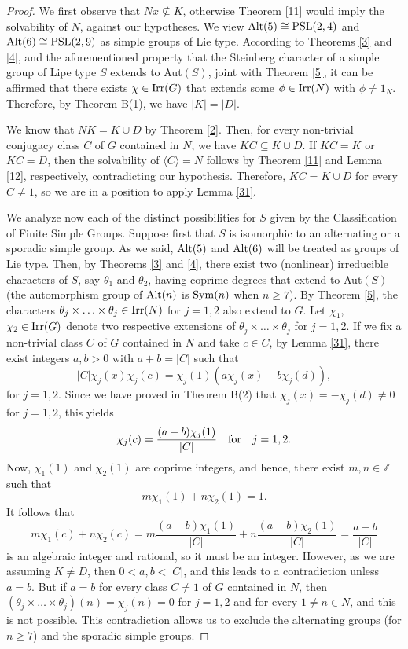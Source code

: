 \documentclass[12pt,leqno,a4paper]{amsart}
\numberwithin{equation}{section}
\begin{document}
\begin{proof}  We first observe that $Nx\not\subseteq K$, otherwise Theorem \ref{11} would imply the solvability of $N$, against our hypotheses. We view ${\rm Alt}(5)\cong {\rm PSL}(2, 4)$ and ${\rm Alt}(6)\cong {\rm PSL}(2, 9)$ as simple groups of Lie type. According to  Theorems \ref{3} and \ref{4}, and the aforementioned property that the Steinberg character of a simple group of Lipe type $S$ extends to Aut$(S)$, joint with  Theorem \ref{5},  it can be affirmed that there exists $\chi \in {\rm Irr}(G)$  that extends some $\phi\in {\rm Irr}(N)$ with $\phi\neq 1_N$.  Therefore, by Theorem B(1),  we have $|K|=|D|$.




\medskip
We know that $NK=K \cup D$ by Theorem \ref{2}. Then, for every non-trivial conjugacy class $C$ of $G$ contained in $N$, we have $KC\subseteq K \cup D$. If $KC=K$ or $KC=D$, then  the solvability of $\langle C\rangle= N$ follows  by Theorem \ref{11} and Lemma \ref{12}, respectively, contradicting our hypothesis. Therefore, $KC=K\cup D$ for every $C\neq 1$, so we are in a position to apply
 Lemma \ref{31}.
\medskip




We  analyze now each of the distinct possibilities for $S$ given by the Classification of Finite Simple Groups.
Suppose first that $S$ is isomorphic to an alternating  or a sporadic simple group. As we said, ${\rm Alt}(5)$ and ${\rm Alt}(6)$ will be treated as groups of Lie type. Then, by Theorems \ref{3} and \ref{4}, there exist two (nonlinear) irreducible characters of $S$, say $\theta_1$ and $\theta_2$, having  coprime degrees that extend to Aut$(S)$ (the automorphism group of ${\rm Alt}(n)$ is ${\rm Sym}(n)$ when $n\geq 7$). By Theorem \ref{5},  the characters $\theta_j\times \ldots \times \theta_j\in {\rm Irr}(N)$ for $j=1,2$ also extend to $G$. Let $\chi_1$, $\chi_2\in {\rm Irr}(G)$ denote two respective extensions of $\theta_j\times \ldots \times \theta_j$ for $j=1,2$.
 If we fix a non-trivial class $C$ of $G$ contained in $N$ and take $c\in C$,  by
 Lemma \ref{31},  there exist integers $a, b> 0$ with $a+b=|C|$ such that
$$|C|\chi_j(x)\chi_j(c)= \chi_j(1)(a \chi_j(x) + b \chi_j(d)),
$$
for $j=1,2$. Since we have proved in Theorem B(2) that $\chi_j(x)=-\chi_j(d)\neq 0$ for $j=1,2$, this yields
$$\chi_j(c)= \frac{(a-b)\chi_j(1)}{|C|} \quad {\rm for \quad } j=1,2.$$
Now, $\chi_1(1)$ and $\chi_2(1)$ are coprime integers, and hence, there exist $m,n\in {\mathbb Z}$ such that
$$m\chi_1(1)+n\chi_2(1)=1.$$
It follows that
$$m\chi_1(c)+ n\chi_2(c)=m \frac{(a-b)\chi_1(1)}{|C|} + n\frac{(a-b)\chi_2(1)}{|C|}= \frac{a-b}{|C|}$$
is an algebraic integer and rational, so it must be an integer. However,  as we are assuming $K\neq D$, then $0<a,b<|C|$, and this leads to a contradiction unless $a=b$. But if $a=b$  for every class $C\neq 1$ of $G$ contained in $N$, then $(\theta_j\times\ldots\times \theta_j)(n)= \chi_j(n)=0$ for $j=1,2$ and for every $1\neq n\in N$, and this is not possible. This contradiction  allows us to exclude the alternating groups (for $n\geq 7$) and the sporadic simple groups.


\end{proof}
\end{document}
